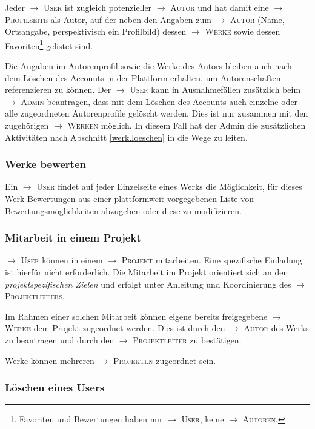 \documentclass[a4paper,11pt]{article}
\newcommand{\glossar}[1]{{$\to$ \textsc{#1}}}
\begin{document}
Jeder \glossar{User} ist zugleich potenzieller \glossar{Autor} und hat damit
eine \glossar{Profilseite} als Autor, auf der neben den Angaben zum
\glossar{Autor} (Name, Ortsangabe, perspektivisch ein Profilbild) dessen
\glossar{Werke} sowie dessen Favoriten\footnote{Favoriten und Bewertungen
  haben nur \glossar{User}, keine \glossar{Autoren}.} gelistet sind.

Die Angaben im Autorenprofil sowie die Werke des Autors bleiben auch nach dem
Löschen des Accounts in der Plattform erhalten, um Autorenschaften
referenzieren zu können.  Der \glossar{User} kann in Ausnahmefällen zusätzlich
beim \glossar{Admin} beantragen, dass mit dem Löschen des Accounts auch
einzelne oder alle zugeordneten Autorenprofile gelöscht werden.  Dies ist nur
zusammen mit den zugehörigen \glossar{Werken} möglich. In diesem Fall hat der
Admin die zusätzlichen Aktivitäten nach Abschnitt \ref{werk.loeschen} in die
Wege zu leiten.

\subsubsection{Werke bewerten}

Ein \glossar{User} findet auf jeder Einzelseite eines Werks die Möglichkeit,
für dieses Werk Bewertungen aus einer plattformweit vorgegebenen Liste von
Bewertungsmöglichkeiten abzugeben oder diese zu modifizieren. 

\subsubsection{Mitarbeit in einem Projekt}

\glossar{User} können in einem \glossar{Projekt} mitarbeiten.  Eine spezifische
Einladung ist hierfür nicht erforderlich. Die Mitarbeit im Projekt orientiert
sich an den \emph{projektspezifischen Zielen} und erfolgt unter Anleitung und
Koordinierung des \glossar{Projektleiters}.

Im Rahmen einer solchen Mitarbeit können eigene bereits freigegebene
\glossar{Werke} dem Projekt zugeordnet werden. Dies ist durch den
\glossar{Autor} des Werks zu beantragen und durch den \glossar{Projektleiter}
zu bestätigen.

Werke können mehreren \glossar{Projekten} zugeordnet sein. 

\subsubsection{Löschen eines Users}\label{nutzer.loeschen}
\end{document}
